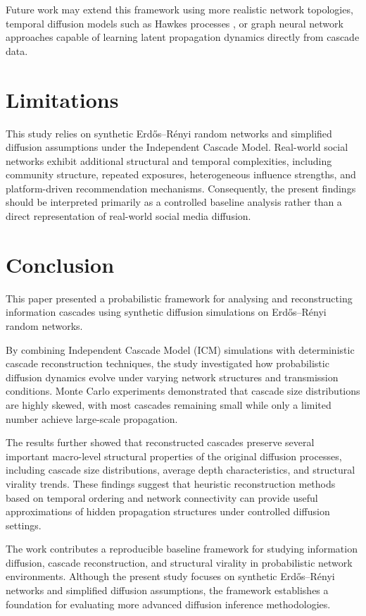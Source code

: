 \documentclass{article}
\begin{document}
\begin{enumerate}
Future work may extend this framework using more realistic network topologies, temporal diffusion models such as Hawkes processes \citep{kong2020modeling}, or graph neural network approaches capable of learning latent propagation dynamics directly from cascade data.
\section{Limitations}

This study relies on synthetic Erd\H{o}s--R\'enyi random networks and simplified diffusion assumptions under the Independent Cascade Model. Real-world social networks exhibit additional structural and temporal complexities, including community structure, repeated exposures, heterogeneous influence strengths, and platform-driven recommendation mechanisms. Consequently, the present findings should be interpreted primarily as a controlled baseline analysis rather than a direct representation of real-world social media diffusion.

\section{Conclusion}

This paper presented a probabilistic framework for analysing and reconstructing information cascades using synthetic diffusion simulations on Erd\H{o}s--R\'enyi random networks.

By combining Independent Cascade Model (ICM) simulations with deterministic cascade reconstruction techniques, the study investigated how probabilistic diffusion dynamics evolve under varying network structures and transmission conditions. Monte Carlo experiments demonstrated that cascade size distributions are highly skewed, with most cascades remaining small while only a limited number achieve large-scale propagation.

The results further showed that reconstructed cascades preserve several important macro-level structural properties of the original diffusion processes, including cascade size distributions, average depth characteristics, and structural virality trends. These findings suggest that heuristic reconstruction methods based on temporal ordering and network connectivity can provide useful approximations of hidden propagation structures under controlled diffusion settings.

The work contributes a reproducible baseline framework for studying information diffusion, cascade reconstruction, and structural virality in probabilistic network environments. Although the present study focuses on synthetic Erd\H{o}s--R\'enyi networks and simplified diffusion assumptions, the framework establishes a foundation for evaluating more advanced diffusion inference methodologies.


\end{enumerate}
\end{document}
